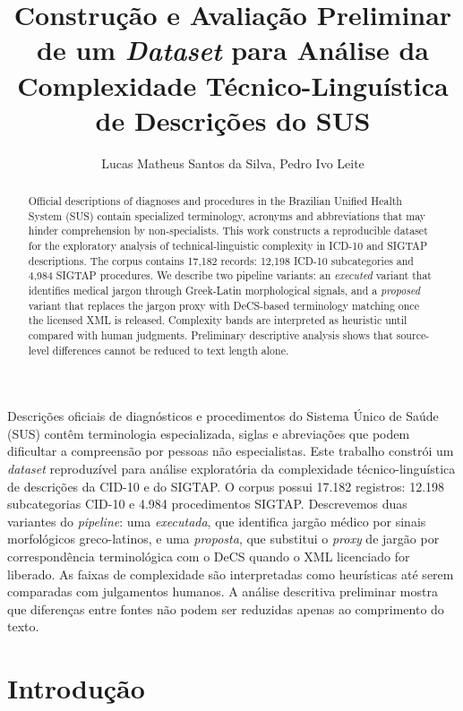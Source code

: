 \documentclass[12pt]{article}
\title{Construção e Avaliação Preliminar de um \textit{Dataset} para Análise da Complexidade Técnico-Linguística de Descrições do SUS}
\author{Lucas Matheus Santos da Silva\inst{1}, Pedro Ivo Leite\inst{1}}
\begin{document}
\maketitle

\begin{abstract}
Official descriptions of diagnoses and procedures in the Brazilian Unified
Health System (SUS) contain specialized terminology, acronyms and
abbreviations that may hinder comprehension by non-specialists. This work
constructs a reproducible dataset for the exploratory analysis of
technical-linguistic complexity in ICD-10 and SIGTAP descriptions. The corpus
contains 17{,}182 records: 12{,}198 ICD-10 subcategories and 4{,}984 SIGTAP
procedures. We describe two pipeline variants: an \emph{executed} variant that
identifies medical jargon through Greek-Latin morphological signals, and a
\emph{proposed} variant that replaces the jargon proxy with DeCS-based
terminology matching once the licensed XML is released. Complexity bands are
interpreted as heuristic until compared with human judgments. Preliminary
descriptive analysis shows that source-level differences cannot be reduced to
text length alone.
\end{abstract}

\begin{resumo}
Descrições oficiais de diagnósticos e procedimentos do Sistema Único de Saúde
(SUS) contêm terminologia especializada, siglas e abreviações que podem
dificultar a compreensão por pessoas não especialistas. Este trabalho constrói
um \textit{dataset} reproduzível para análise exploratória da complexidade
técnico-linguística de descrições da CID-10 e do SIGTAP. O corpus possui
17.182 registros: 12.198 subcategorias CID-10 e 4.984 procedimentos SIGTAP.
Descrevemos duas variantes do \textit{pipeline}: uma \emph{executada}, que
identifica jargão médico por sinais morfológicos greco-latinos, e uma
\emph{proposta}, que substitui o \textit{proxy} de jargão por correspondência
terminológica com o DeCS quando o XML licenciado for liberado. As faixas de
complexidade são interpretadas como heurísticas até serem comparadas com
julgamentos humanos. A análise descritiva preliminar mostra que diferenças
entre fontes não podem ser reduzidas apenas ao comprimento do texto.
\end{resumo}

\section{Introdução}
\end{document}
